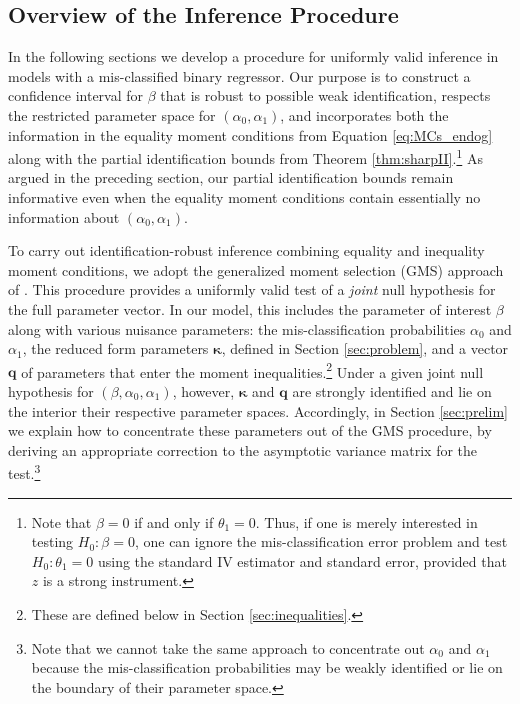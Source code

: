 \subsection{Overview of the Inference Procedure}
\label{sec:overview}
In the following sections we develop a procedure for uniformly valid inference in models with a mis-classified binary regressor.
Our purpose is to construct a confidence interval for $\beta$ that is robust to possible weak identification, respects the restricted parameter space for $(\alpha_0, \alpha_1)$, and incorporates both the information in the equality moment conditions from Equation \ref{eq:MCs_endog} along with the partial identification bounds from Theorem \ref{thm:sharpII}.\footnote{Note that $\beta=0$ if and only if $\theta_1 = 0$. Thus, if one is merely interested in testing $H_0\colon \beta=0$, one can ignore the mis-classification error problem and test $H_0\colon \theta_1 = 0$ using the standard IV estimator and standard error, provided that $z$ is a strong instrument.}
As argued in the preceding section, our partial identification bounds remain informative even when the equality moment conditions contain essentially no information about $(\alpha_0, \alpha_1)$.

To carry out identification-robust inference combining equality and inequality moment conditions, we adopt the generalized moment selection (GMS) approach of \cite{AndrewsSoares}.
This procedure provides a uniformly valid test of a \emph{joint} null hypothesis for the full parameter vector.
In our model, this includes the parameter of interest $\beta$ along with various nuisance parameters: the mis-classification probabilities $\alpha_0$ and $\alpha_1$, the reduced form parameters $\boldsymbol{\kappa}$, defined in Section \ref{sec:problem}, and a vector $\mathbf{q}$ of parameters that enter the moment inequalities.\footnote{These are defined below in Section \ref{sec:inequalities}.}
Under a given joint null hypothesis for $(\beta, \alpha_0, \alpha_1)$, however, $\boldsymbol{\kappa}$ and $\mathbf{q}$ are strongly identified and lie on the interior their respective parameter spaces. 
Accordingly, in Section \ref{sec:prelim} we explain how to concentrate these parameters out of the GMS procedure, by deriving an appropriate correction to the asymptotic variance matrix for the test.\footnote{Note that we cannot take the same approach to concentrate out $\alpha_0$ and $\alpha_1$ because the mis-classification probabilities may be weakly identified or lie on the boundary of their parameter space.}

